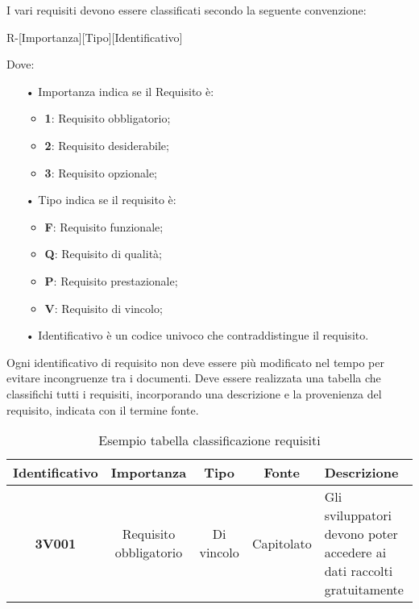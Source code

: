 I vari requisiti devono essere classificati secondo la seguente {convenzione}:
\begin{center}
R-[Importanza][Tipo][Identificativo]
\end{center}
Dove:
\begin{itemize}
\item[•] Importanza indica se il Requisito è:
\begin{itemize}
\item \textbf{1}: Requisito obbligatorio;
\item \textbf{2}: Requisito desiderabile;
\item \textbf{3}: Requisito opzionale;
\end{itemize}
\item[•] Tipo indica se il requisito è:
\begin{itemize}
\item \textbf{F}: Requisito funzionale;
\item \textbf{Q}: Requisito di qualità;
\item \textbf{P}: Requisito prestazionale;
\item \textbf{V}: Requisito di vincolo;
\end{itemize}
\item[•] Identificativo è un codice univoco che contraddistingue il requisito.
\end{itemize}
Ogni identificativo di requisito non deve essere più modificato nel tempo per evitare incongruenze tra i documenti.
Deve essere realizzata una tabella che classifichi tutti i requisiti, incorporando una descrizione e la provenienza del requisito, indicata con il termine fonte.
\begin{table}[H]
\centering
\begin{tabularx}{\linewidth}{| c | c | c | c | Z |}
\hline
\textbf{Identificativo} & \textbf{Importanza} & \textbf{Tipo} & \textbf{Fonte} & \textbf{Descrizione} \\
\hline
\textbf{3V001} & Requisito obbligatorio & Di vincolo & Capitolato & Gli sviluppatori devono poter accedere ai dati raccolti gratuitamente \\
\hline
\end{tabularx}
\caption{Esempio tabella classificazione requisiti}
\end{table}
